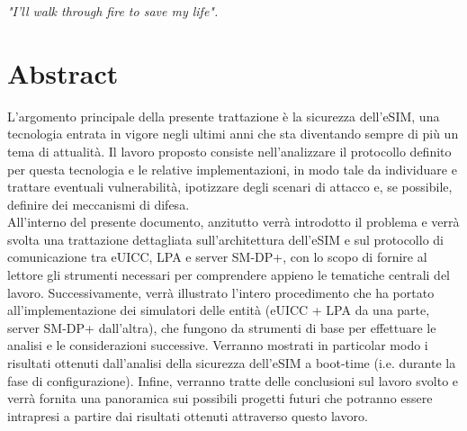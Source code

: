 \documentclass[10pt, oneside]{book}
\begin{document}
\begin{frontespizio}
\end{frontespizio}

\begin{flushright}
\null{}
\textit{"I'll walk through fire to save my life".}
\null
\end{flushright}

\chapter*{Abstract}
L'argomento principale della presente trattazione è la sicurezza dell'eSIM, una tecnologia entrata in vigore negli ultimi anni che sta diventando sempre di più un tema di attualità. Il lavoro proposto consiste nell'analizzare il protocollo definito per questa tecnologia e le relative implementazioni, in modo tale da individuare e trattare eventuali vulnerabilità, ipotizzare degli scenari di attacco e, se possibile, definire dei meccanismi di difesa.\\
All'interno del presente documento, anzitutto verrà introdotto il problema e verrà svolta una trattazione dettagliata sull'architettura dell'eSIM e sul protocollo di comunicazione tra eUICC, LPA e server SM-DP+, con lo scopo di fornire al lettore gli strumenti necessari per comprendere appieno le tematiche centrali del lavoro. Successivamente, verrà illustrato l'intero procedimento che ha portato all'implementazione dei simulatori delle entità (eUICC + LPA da una parte, server SM-DP+ dall'altra), che fungono da strumenti di base per effettuare le analisi e le considerazioni successive. Verranno mostrati in particolar modo i risultati ottenuti dall'analisi della sicurezza dell'eSIM a boot-time (i.e. durante la fase di configurazione). Infine, verranno tratte delle conclusioni sul lavoro svolto e verrà fornita una panoramica sui possibili progetti futuri che potranno essere intrapresi a partire dai risultati ottenuti attraverso questo lavoro.
\end{document}
